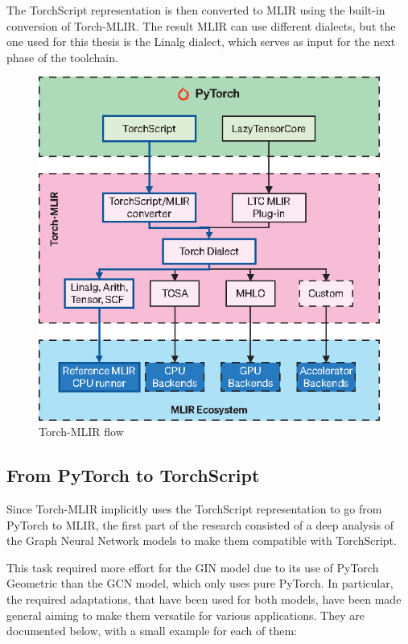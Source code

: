 The TorchScript representation is then converted to MLIR using the built-in conversion of Torch-MLIR. The result MLIR can use different dialects, but the one used for this thesis is the Linalg dialect, which serves as input for the next phase of the toolchain.

\begin{figure}[t]
    \centering
    \includegraphics[height=0.5\textwidth]{Images/torch-mlir}
    \caption{Torch-MLIR flow}
    \label{fig:torch-mlir}
\end{figure}

\subsection{From PyTorch to TorchScript}
\label{subsec:pytorch-to-torchscript}%

Since Torch-MLIR implicitly uses the TorchScript representation to go from PyTorch to MLIR, the first part of the research consisted of a deep analysis of the Graph Neural Network models to make them compatible with TorchScript.

This task required more effort for the GIN model due to its use of PyTorch Geometric than the GCN model, which only uses pure PyTorch.
In particular, the required adaptations, that have been used for both models, have been made general aiming to make them versatile for various applications.
They are documented below, with a small example for each of them:

